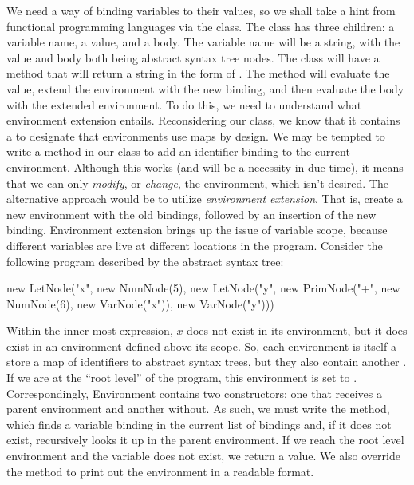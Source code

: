 We need a way of binding variables to their values, so we shall take a hint from functional programming languages via the  class. The  class has three children: a variable name, a value, and a body. The variable name will be a string, with the value and body both being abstract syntax tree nodes. The  class will have a  method that will return a string in the form of . The  method will evaluate the value, extend the environment with the new binding, and then evaluate the body with the extended environment. To do this, we need to understand what environment extension entails. Reconsidering our  class, we know that it contains a  to designate that environments use maps by design. We may be tempted to write a  method in our  class to add an identifier binding to the current environment. Although this works (and will be a necessity in due time), it means that we can only \emph{modify}, or \emph{change}, the environment, which isn't desired. The alternative approach would be to utilize \emph{environment extension}. That is, create a new environment with the old bindings, followed by an insertion of the new binding. Environment extension brings up the issue of variable scope, because different variables are live at different locations in the program. Consider the following program described by the abstract syntax tree:

\begin{verbnobox}[\small]
new LetNode("x", new NumNode(5), 
 new LetNode("y", new PrimNode("+", new NumNode(6), new VarNode("x")), 
  new VarNode("y")))
\end{verbnobox}
  
Within the inner-most  expression, $x$ does not exist in its environment, but it does exist in an environment defined above its scope. So, each environment is itself a store a map of identifiers to abstract syntax trees, but they also contain another . If we are at the ``root level'' of the program, this environment is set to . Correspondingly, Environment contains two constructors: one that receives a parent environment and another without. As such, we must write the  method, which finds a variable binding in the current list of bindings and, if it does not exist, recursively looks it up in the parent environment. If we reach the root level environment and the variable does not exist, we return a  value. We also override the  method to print out the environment in a readable format.

